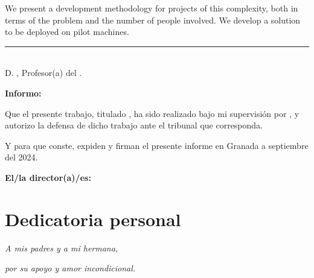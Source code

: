 We present a development methodology for projects of this complexity, both in terms of the problem and the number of people involved.
We develop a solution to be deployed on pilot machines.

\cleardoublepage

\thispagestyle{empty}

\noindent\rule[-1ex]{\textwidth}{2pt}\\[4.5ex]

D. \textbf{\tutor}, Profesor(a) del \departamento.

\vspace{0.5cm}

\textbf{Informo:}

\vspace{0.5cm}

Que el presente trabajo, titulado \textit{\textbf{\titulo}},
ha sido realizado bajo mi supervisión por \textbf{\autor}, y autorizo la defensa de dicho trabajo ante el tribunal
que corresponda.

\vspace{0.5cm}

Y para que conste, expiden y firman el presente informe en Granada a septiembre del 2024.

\vspace{1cm}

\textbf{El/la director(a)/es: }

\vspace{5cm}

\noindent \textbf{\tutor}

\chapter*{Dedicatoria personal}

\begin{center}
	\textit{A mis padres y a mi hermana,}

	\textit{por su apoyo y amor incondicional.}
\end{center}


